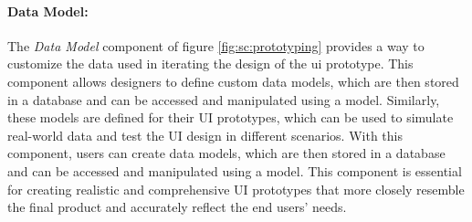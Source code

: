 \paragraph{Data Model:}
The \textit{Data Model} component of figure \ref{fig:sc:prototyping} provides a way to customize the data used in iterating the design of the \ac{ui} prototype. 
This component allows designers to define custom data models, which are then stored in a database and can be accessed and manipulated using a model.  
Similarly, these models are defined for their UI prototypes, which can be used to simulate real-world data and test the UI design in different scenarios. 
With this component, users can create data models, which are then stored in a database and can be accessed and manipulated using a model. 
This component is essential for creating realistic and comprehensive UI prototypes that more closely resemble the final product and accurately reflect the end users' needs.


